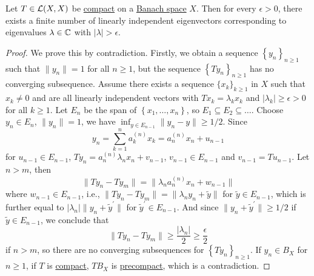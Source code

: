 \begin{theorem}\label{thm:point-spectrum-of-compact-op}
	Let \(T\in \mathcal{\MakeUppercase{l}} (X, X)\) be \hyperref[def:compact-op]{compact} on a \hyperref[def:Banach-space]{Banach space} \(X\). Then for every \(\epsilon > 0\), there exists a finite number of linearly independent eigenvectors corresponding to eigenvalues \(\lambda \in \mathbb{\MakeUppercase{c}} \) with \(\vert \lambda  \vert > \epsilon \).
\end{theorem}
\begin{proof}
	We prove this by contradiction. Firstly, we obtain a sequence \(\left\{ y_n \right\} _{n\geq 1}\) such that \(\lVert y_n \rVert = 1\) for all \(n\geq 1\), but the sequence \(\left\{ Ty_n \right\} _{n\geq 1}\) has no converging subsequence. Assume there exists a sequence \(\{x_k\}_{k\geq 1}\) in \(X\) such that \(x_k \neq 0\) and are all linearly independent vectors with \(Tx_k = \lambda _k x_k\) and \(\vert \lambda _k \vert \geq \epsilon > 0\) for all \(k\geq 1\). Let \(E_n\) be the span of \(\left\{ x_1, \ldots , x_n \right\}\), so \(E_1 \subseteq E_2 \subseteq \ldots \). Choose \(y_n \in E_n\), \(\lVert y_n \rVert = 1\), we have \(\inf _{y\in E_{n-1}} \lVert y_n - y \rVert \geq 1 / 2\). Since
	\[
		y_n = \sum_{k=1}^{n} a_k^{(n)} x_k = a_n ^{(n)} x_n + u_{n-1}
	\]
	for \(u_{n-1} \in E_{n-1}\), \(Ty_n = a_n^{(n)} \lambda _n x_n + v_{n-1}\), \(v_{n-1}\in E_{n-1}\) and \(v_{n-1} = Tu_{n-1}\). Let \(n > m\), then
	\[
		\lVert Ty_n - Ty_m \rVert = \lVert \lambda _n a_n ^{(n)} x_n + w_{n-1}\rVert
	\]
	where \(w_{n-1} \in E_{n-1}\), i.e., \(\lVert Ty_n - Ty_m \rVert = \lVert \lambda _n y_n + \widetilde{y}  \rVert \) for \(\widetilde{y} \in E_{n-1}\), which is further equal to \(\vert \lambda _n \vert \lVert y_n + \widetilde{y} ^\prime  \rVert \) for \(\widetilde{y} ^\prime \in E_{n-1}\). And since \(\lVert y_n + \widetilde{y} ^\prime  \rVert \geq 1 / 2\) if \(\widetilde{y} \in E_{n-1}\), we conclude that
	\[
		\lVert Ty_n - Ty_m \rVert \geq \frac{\vert \lambda _n \vert }{2} \geq \frac{\epsilon}{2}
	\]
	if \(n > m\), so there are no converging subsequences for \(\left\{ Ty_n \right\} _{n\geq 1}\). If \(y_n\in B_X\) for \(n\geq 1\), if \(T\) is \hyperref[def:compact-op]{compact}, \(TB_X\) is \hyperref[def:precompact]{precompact}, which is a contradiction.
\end{proof}

